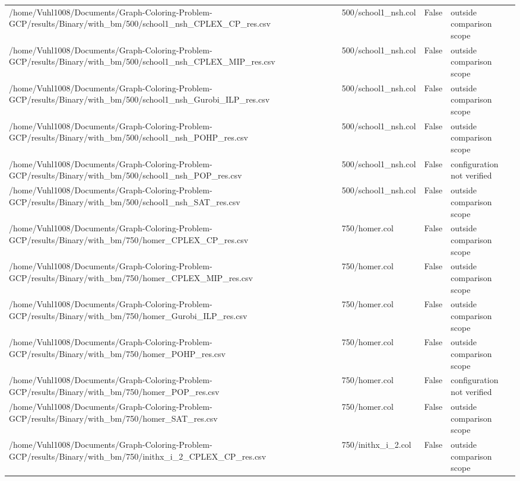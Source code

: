 \begin{table}[htbp]
\begin{tabular}{llll}
/home/Vuhl1008/Documents/Graph-Coloring-Problem-GCP/results/Binary/with\_bm/500/school1\_nsh\_CPLEX\_CP\_res.csv & 500/school1\_nsh.col & False & outside comparison scope \\
/home/Vuhl1008/Documents/Graph-Coloring-Problem-GCP/results/Binary/with\_bm/500/school1\_nsh\_CPLEX\_MIP\_res.csv & 500/school1\_nsh.col & False & outside comparison scope \\
/home/Vuhl1008/Documents/Graph-Coloring-Problem-GCP/results/Binary/with\_bm/500/school1\_nsh\_Gurobi\_ILP\_res.csv & 500/school1\_nsh.col & False & outside comparison scope \\
/home/Vuhl1008/Documents/Graph-Coloring-Problem-GCP/results/Binary/with\_bm/500/school1\_nsh\_POHP\_res.csv & 500/school1\_nsh.col & False & outside comparison scope \\
/home/Vuhl1008/Documents/Graph-Coloring-Problem-GCP/results/Binary/with\_bm/500/school1\_nsh\_POP\_res.csv & 500/school1\_nsh.col & False & configuration not verified \\
/home/Vuhl1008/Documents/Graph-Coloring-Problem-GCP/results/Binary/with\_bm/500/school1\_nsh\_SAT\_res.csv & 500/school1\_nsh.col & False & outside comparison scope \\
/home/Vuhl1008/Documents/Graph-Coloring-Problem-GCP/results/Binary/with\_bm/750/homer\_CPLEX\_CP\_res.csv & 750/homer.col & False & outside comparison scope \\
/home/Vuhl1008/Documents/Graph-Coloring-Problem-GCP/results/Binary/with\_bm/750/homer\_CPLEX\_MIP\_res.csv & 750/homer.col & False & outside comparison scope \\
/home/Vuhl1008/Documents/Graph-Coloring-Problem-GCP/results/Binary/with\_bm/750/homer\_Gurobi\_ILP\_res.csv & 750/homer.col & False & outside comparison scope \\
/home/Vuhl1008/Documents/Graph-Coloring-Problem-GCP/results/Binary/with\_bm/750/homer\_POHP\_res.csv & 750/homer.col & False & outside comparison scope \\
/home/Vuhl1008/Documents/Graph-Coloring-Problem-GCP/results/Binary/with\_bm/750/homer\_POP\_res.csv & 750/homer.col & False & configuration not verified \\
/home/Vuhl1008/Documents/Graph-Coloring-Problem-GCP/results/Binary/with\_bm/750/homer\_SAT\_res.csv & 750/homer.col & False & outside comparison scope \\
/home/Vuhl1008/Documents/Graph-Coloring-Problem-GCP/results/Binary/with\_bm/750/inithx\_i\_2\_CPLEX\_CP\_res.csv & 750/inithx\_i\_2.col & False & outside comparison scope \\

\end{tabular}
\end{table}
